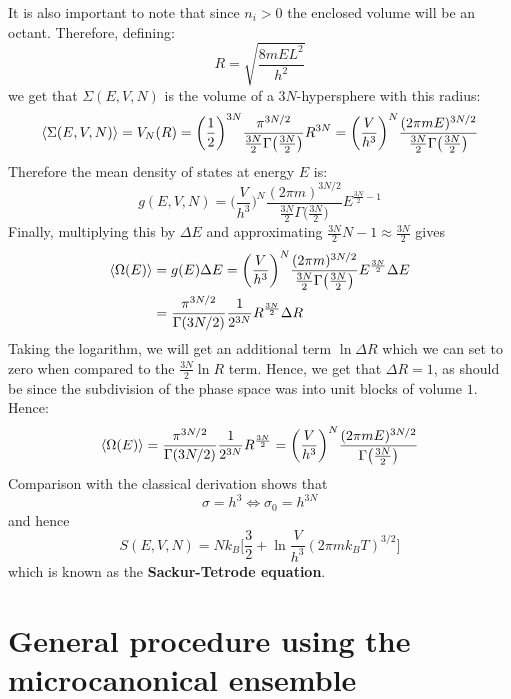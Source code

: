 \documentclass[a4paper,11pt,oneside]{book}
\begin{document}
It is also important to note that since $n_i>0$ the enclosed volume will be an octant. Therefore, defining:
\begin{equation}
    R = \sqrt{\frac{8mEL^2}{h^2}}
\end{equation}
we get that $\Sigma(E,V,N)$ is the volume of a $3N$-hypersphere with this radius:
\begin{equation}
    \braket{\Sigma(E,V,N)} = V_N(R) = \bigg(\frac{1}{2}\bigg)^{3N}\frac{\pi^{3N/2}}{\frac{3N}{2}\Gamma\big(\frac{3N}{2}\big)} R^{3N} = \bigg(\frac{V}{h^3}\bigg)^N \frac{(2 \pi m E)^{3N/2}}{\frac{3N}{2} \Gamma\big(\frac{3N}{2}\big)}
\end{equation}
Therefore the mean density of states at energy $E$ is:
\begin{equation}
    g(E,V,N)= \bigg(\frac{V}{h^3}\bigg)^N \frac{(2 \pi m)^{3N/2}}{\frac{3N}{2} \Gamma\big(\frac{3N}{2}\big)}E^{\frac{3N}{2}-1}
\end{equation}
Finally, multiplying this by $\Delta E$ and approximating $\frac{3N}{2}N-1\approx \frac{3N}{2}$ gives
\begin{align}
    \braket{\Omega(E)} &= g(E) \Delta E =\bigg(\frac{V}{h^3}\bigg)^N \frac{(2 \pi m)^{3N/2}}{\frac{3N}{2} \Gamma\big(\frac{3N}{2}\big)}E^{\frac{3N}{2}} \Delta E \\
    &=\frac{\pi^{3N/2}}{\Gamma(3N/2)} \frac{1}{2^{3N}} R^{\frac{3N}{2}} \Delta R
\end{align}
Taking the logarithm, we will get an additional term $\ln \Delta R$ which we can set to zero when compared to the $\frac{3N}{2} \ln R$ term. Hence, we get that $\Delta R = 1$, as should be since the subdivision of the phase space was into unit blocks of volume $1$. Hence:
\begin{equation}
     \braket{\Omega(E)} = \frac{\pi^{3N/2}}{\Gamma(3N/2)} \frac{1}{2^{3N}} R^{\frac{3N}{2}} = \bigg(\frac{V}{h^3}\bigg)^N \frac{(2 \pi m E)^{3N/2}}{ \Gamma\big(\frac{3N}{2}\big)}
\end{equation}
Comparison with the classical derivation shows that 
\begin{equation}
    \sigma = h^3 \iff \sigma_0 = h^{3N}
\end{equation}
and hence
\begin{equation}
    \boxed{ S(E,V,N) = Nk_B \bigg[\frac{3}{2}+\ln \frac{V}{h^3}(2 \pi m k_B T)^{3/2}\bigg]}
\end{equation}
which is known as the \textbf{Sackur-Tetrode equation}.
\section{General procedure using the microcanonical ensemble}
\end{document}

